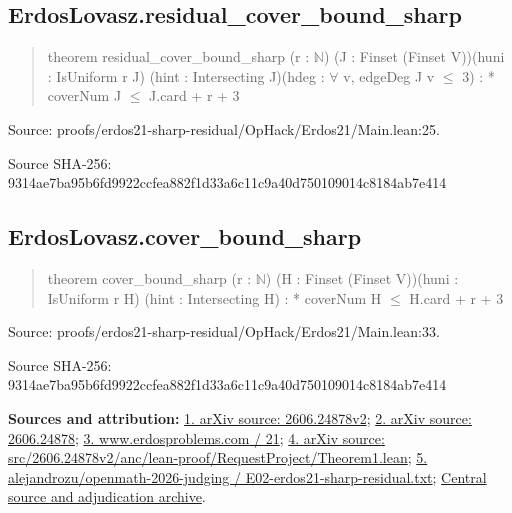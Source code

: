 \documentclass[11pt,a4paper]{article}
\begin{document}
\begin{samepage}
\subsection{ErdosLovasz.residual\_cover\_bound\_sharp}
\begin{quote}\small\ttfamily theorem residual\_cover\_bound\_sharp (r : \ensuremath{\mathbb{N}}) (J : Finset (Finset V))\newline     (huni : IsUniform r J) (hint : Intersecting J)\newline     (hdeg : \ensuremath{\forall} v, edgeDeg J v \ensuremath{\leq} 3) : * coverNum J \ensuremath{\leq} J.card + r + 3\end{quote}
{\small Source: proofs/erdos21-sharp-residual/OpHack/Erdos21/Main.lean:25.\par}

{\small Source SHA-256: 9314ae7ba95b6fd9922ccfea882f1d33a6c11c9a40d750109014c8184ab7e414\par}

\end{samepage}
\begin{samepage}
\subsection{ErdosLovasz.cover\_bound\_sharp}
\begin{quote}\small\ttfamily theorem cover\_bound\_sharp (r : \ensuremath{\mathbb{N}}) (H : Finset (Finset V))\newline     (huni : IsUniform r H) (hint : Intersecting H) : * coverNum H \ensuremath{\leq} H.card + r + 3\end{quote}
{\small Source: proofs/erdos21-sharp-residual/OpHack/Erdos21/Main.lean:33.\par}

{\small Source SHA-256: 9314ae7ba95b6fd9922ccfea882f1d33a6c11c9a40d750109014c8184ab7e414\par}

{\small\textbf{Sources and attribution:} \href{https://arxiv.org/html/2606.24878v2}{1. arXiv source: 2606.24878v2}; \href{https://arxiv.org/abs/2606.24878}{2. arXiv source: 2606.24878}; \href{https://www.erdosproblems.com/21}{3. www.erdosproblems.com / 21}; \href{https://arxiv.org/src/2606.24878v2/anc/lean-proof/RequestProject/Theorem1.lean}{4. arXiv source: src/2606.24878v2/anc/lean-proof/RequestProject/Theorem1.lean}; \href{https://github.com/alejandrozu/openmath-2026-judging/blob/d0ed487f487fa7ec814ff705ab55249983fe8707/OpenMath-Judging/review/entries/E02-erdos21-sharp-residual.txt}{5. alejandrozu/openmath-2026-judging / E02-erdos21-sharp-residual.txt}; \href{https://github.com/alejandrozu/openmath-2026-judging}{Central source and adjudication archive}.\par}

\end{samepage}
\end{document}
